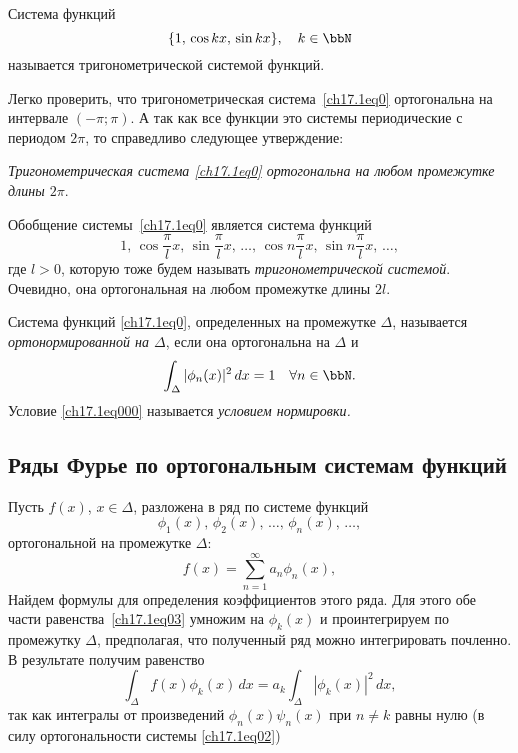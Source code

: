 \begin{defn}
Система функций 
\begin{equation} \label{ch17.1eq0}
\{1,\,\cos kx,\,\sin kx\}, \quad k\in \bbN
\end{equation}
называется тригонометрической системой функций.			
\end{defn}
Легко проверить, что тригонометрическая система~\eqref{ch17.1eq0} ортогональна на интервале $(-\pi;\pi)$. А так как все функции это системы периодические с периодом $2\pi$, то справедливо следующее утверждение:

\textit{Тригонометрическая система \eqref{ch17.1eq0} ортогональна на любом промежутке длины $2\pi$}.	

Обобщение системы~\eqref{ch17.1eq0} является система функций
$$
1,\,\cos \frac{\pi}{l}x,\,\sin \frac{\pi}{l}x,\,\ldots,\,\cos n\frac{\pi}{l}x,\,\sin n\frac{\pi}{l}x,\,\ldots,
$$
где $l>0$, которую тоже будем называть \textit{тригонометрической системой}. Очевидно, она ортогональная на любом промежутке длины $2l$.
\begin{defn}
Система функций \eqref{ch17.1eq0}, определенных на промежутке $\Delta$, называется \textit{ортонормированной на $\Delta$}, если она ортогональна на $\Delta$ и 
\begin{equation} \label{ch17.1eq000}
\int _\Delta{|\phi_n(x)|^2\,dx=1} \quad \forall n \in \bbN.
\end{equation}
Условие \eqref{ch17.1eq000} называется \textit{условием нормировки.}
\end{defn}

\subsection{Ряды Фурье по ортогональным системам функций}

Пусть $f(x)$, $x \in \Delta$, разложена в ряд по системе функций
\begin{equation} \label{ch17.1eq02}
\phi_1(x),\,\phi_2(x),\,\ldots,\,\phi_n(x),\,\ldots,
\end{equation}
ортогональной на промежутке $\Delta$:
\begin{equation} \label{ch17.1eq03}
f(x)= \sum_{n = 1}^{\infty} a_n \phi_n(x),
\end{equation}
Найдем формулы для определения коэффициентов этого ряда. Для этого обе части равенства~\eqref{ch17.1eq03} умножим на $\phi_k(x)$ и проинтегрируем по промежутку $\Delta$, предполагая, что полученный ряд можно интегрировать почленно. В результате получим равенство
$$
\int_\Delta{f(x) \phi_k(x)}\,dx=a_k\int_\Delta|\phi_k(x)|^2\,dx,
$$
так как интегралы от произведений $\phi_n(x)\psi_n(x)$ при $n\ne k$ равны нулю (в силу ортогональности системы \eqref{ch17.1eq02})

